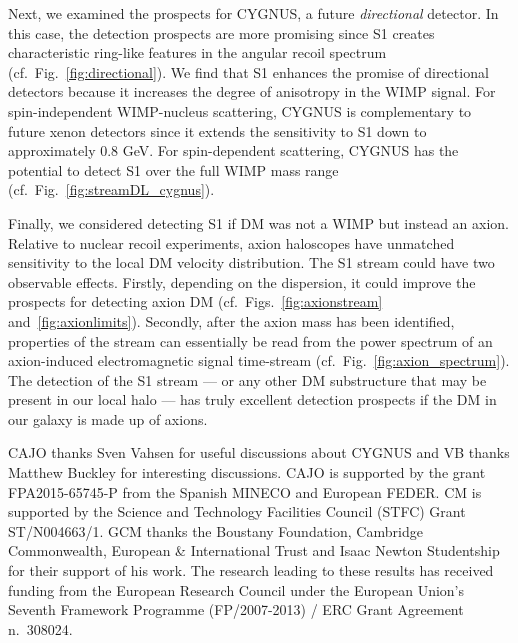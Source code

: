 \documentclass[prd,10pt,twocolumn,showpacs,nofootinbib,aps,superscriptaddress,preprintnumbers]{revtex4-1}
\begin{document}
Next, we examined the prospects for CYGNUS, a future \emph{directional} detector. 
In this case, the detection prospects are more promising since S1 creates characteristic 
ring-like features in the angular recoil spectrum (cf.~Fig.~\ref{fig:directional}). 
We find that S1 enhances the promise of directional detectors because it increases the degree of anisotropy in the WIMP signal. For spin-independent WIMP-nucleus scattering, CYGNUS is complementary to future xenon detectors since it extends the sensitivity to S1 down to approximately 0.8 GeV. For spin-dependent scattering, CYGNUS has the potential to detect S1 over the full WIMP mass range (cf.~Fig.~\ref{fig:streamDL_cygnus}).

Finally, we considered detecting S1 if DM was not a WIMP but instead an axion. 
Relative to nuclear recoil experiments, axion haloscopes have unmatched sensitivity to the local DM velocity distribution.  The S1 stream could have two observable effects. Firstly, depending on the dispersion, it could improve the prospects for detecting axion DM (cf.~Figs.~\ref{fig:axionstream} and~\ref{fig:axionlimits}). Secondly, after the axion mass has been identified, properties of the stream can essentially be read from the 
power spectrum of an axion-induced electromagnetic signal time-stream (cf.~Fig.~\ref{fig:axion_spectrum}). The detection of the S1 stream --- or any other DM substructure that may be present in our local halo --- has truly excellent detection prospects if the DM in our galaxy is made up of axions. 



\acknowledgments
CAJO thanks Sven Vahsen for useful discussions about CYGNUS and VB thanks Matthew Buckley for interesting discussions.
 CAJO is supported by the grant FPA2015-65745-P from the Spanish MINECO and European FEDER. 
CM is supported by the Science and Technology Facilities Council (STFC) Grant ST/N004663/1. 
GCM thanks the Boustany Foundation, Cambridge Commonwealth, European \& International Trust and Isaac Newton Studentship for their support of his work. 
The research leading to these results has received funding from the European Research Council under the European Union's Seventh Framework Programme (FP/2007-2013) / ERC Grant Agreement n.\ 308024.


\maketitle
\flushbottom





\end{document}
